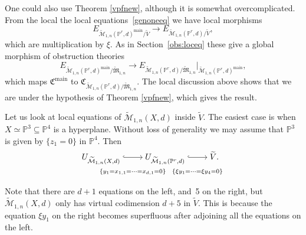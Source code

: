 \documentclass[pdftex]{sigma}
\numberwithin{equation}{section}
\newcommand{\PP}{\mathbb P}
\theoremstyle{plain}
\theoremstyle{definition}
\theoremstyle{remark}
\begin{document}
\begin{Example}
One could also use Theorem \ref{vpfnew}, although it is somewhat overcomplicated. From the local the local equations~\eqref{genoneeq} we have local morphisms
\[ E_{\widetilde{\mathcal{M}}_{1,n}(\PP^r,d)^{\mathrm{main}}/\widetilde{V}}\to E_{\widetilde{\mathcal{M}}_{1,n}(\PP^r,d)/\widetilde{V}},
\]
which are multiplication by $\xi$. As in Section~\ref{obs:loceq} these give a global morphism of obstruction theories
\[
E_{\widetilde{\mathcal{M}}_{1,n}(\PP^r,d)^{\mathrm{main}}/\widetilde{\mathfrak{M}}_{1,n}}\to E_{\widetilde{\mathcal{M}}_{1,n}(\PP^r,d)/\widetilde{\mathfrak{M}}_{1,n}}|_{\widetilde{\mathcal{M}}_{1,n} (\PP^r,d)^{\mathrm{main}}},
\]
which maps $\mathfrak{C}^{\mathrm{main}}$ to $\mathfrak{C}_{\widetilde{\mathcal{M}}_{1,n}(\PP^r,d)/\widetilde{\mathfrak{M}}_{1,n}}$. The local discussion above shows that we are under the hypothesis of Theorem \ref{vpfnew}, which gives the result.
\end{Example}


\begin{Example} Let us look at local equations of $\widetilde{\mathcal{M}}_{1,n}(X,d)$ inside $\widetilde{V}$. The easiest case is when $X\simeq \mathbb P^3\subseteq \mathbb P^4$ is a hyperplane. Without loss of generality we may assume that $\mathbb P^3$ is given by $\{z_1=0\}$ in $\PP^4$. Then
\begin{equation}\label{depeq}
 \begin{tikzcd}[cramped]
 U_{\widetilde{\mathcal{M}}_{1,n}(X,d)} \ar[r,hook,"\{y_1=x_{1,1}=\dots=x_{d,1}=0\}" below=.4cm] & U_{\widetilde{\mathcal{M}}_{1,n}(\PP^r,d)} \ar[r,hook," \{\xi y_1=\dots=\xi y_4=0\} " below=.4cm] & \widetilde{V}.
 \end{tikzcd}
\end{equation}

Note that there are $d+1$ equations on the left, and~5 on the right, but $\widetilde{\mathcal{M}}_{1,n}(X,d)$ only has virtual codimension $d+5$ in $\widetilde{V}$. This is because the equation $\xi y_1$ on the right becomes superfluous after adjoining all the equations on the left.
\end{Example}
\end{document}
